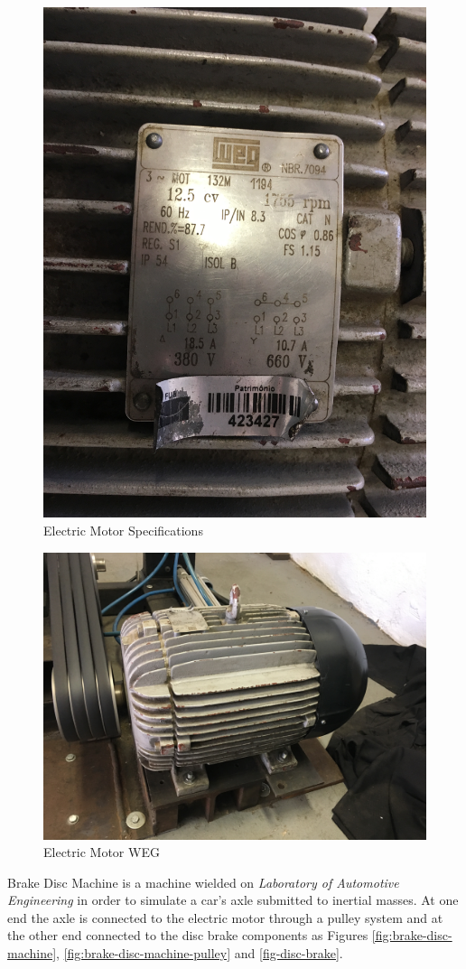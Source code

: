 		\begin{figure}[htbp]
			\centering
			\includegraphics[width=.7\textwidth, angle=270]{figuras/fig-electric-motor-specs}
			\caption{Electric Motor Specifications}
			\label{fig:electric-motor-specs}
		\end{figure}

		\begin{figure}[htbp]
			\centering
			\includegraphics[width=.7\textwidth]{figuras/fig-electric-motor}
			\caption{Electric Motor WEG}
			\label{fig:electric-motor}
		\end{figure}
		\par

		Brake Disc Machine is a machine wielded on \textit{Laboratory of Automotive Engineering} in order to simulate a car's axle submitted to inertial masses. At one end the axle is connected to the electric motor through a pulley system and at the other end connected to the disc brake components as Figures \ref{fig:brake-disc-machine}, \ref{fig:brake-disc-machine-pulley} and \ref{fig-disc-brake}.

